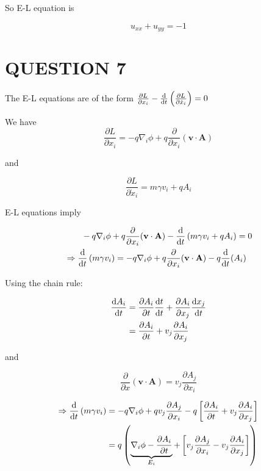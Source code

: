 \documentclass[a4paper]{article}
\begin{document}
\begin{enumerate}
	So E-L equation is 
	
	\[ u_{xx} + u_{yy} = -1  \]
	
	
	
	
	
\end{enumerate}


\section{QUESTION 7}

The E-L equations are of the form $ \frac{\partial L }{\partial x_{i} } - \frac{\mathrm{d} }{\mathrm{d} t} \left(  \frac{\partial L}{\partial \dot{x}_{i}} \right) = 0 $

We have
\[ \frac{\partial L }{\partial x_{i}} = - q \nabla_{i} \phi + q \frac{\partial }{\partial x_{i}} (\mathbf{v} \cdot \mathbf{A}) \]

and

\[ \frac{\partial L }{\partial \dot{x}_{i}} = m \gamma v_{i} + q A_{i} \]


E-L equations imply

\begin{align*}
& \quad \quad - q \nabla_{i} \phi + q \frac{\partial }{\partial x_{i}} (\mathbf{v} \cdot \mathbf{A}) - \frac{\mathrm{d} }{\mathrm{d} t}  \left(  m \gamma v_{i} + q A_{i} \right) = 0   \\
& \Rightarrow  \frac{\mathrm{d} }{\mathrm{d} t}  \left(  m \gamma v_{i} \right) = - q \nabla_{i} \phi + q \frac{\partial }{\partial x_{i}} (\mathbf{v} \cdot \mathbf{A}) - q \frac{\mathrm{d} }{\mathrm{d} t}( A_{i})
 \end{align*}
 
 
Using the chain rule:
 
\begin{align*}
\frac{\mathrm{d} A_{i}}{\mathrm{d} t} & = \frac{\partial A_{i} }{\partial t} \frac{\mathrm{d} t}{\mathrm{d} t } + \frac{\partial A_{i} }{\partial x_{j}} \frac{\mathrm{d} x_{j}}{\mathrm{d} t} \\
& = \frac{\partial A_{i} }{\partial t} +  v_{j} \frac{\partial A_{i} }{\partial x_{j}} 
\end{align*}

and

\[ \frac{\partial }{\partial x} (\mathbf{v} \cdot \mathbf{A}) = v_{j} \frac{\partial A_{j} }{\partial x_{i}}  \]


\begin{align*}
\Rightarrow  \frac{\mathrm{d} }{\mathrm{d} t}  \left(  m \gamma v_{i} \right) & = - q \nabla_{i} \phi + q v_{j} \frac{\partial A_{j} }{\partial x_{i}} - q \left[  \frac{\partial A_{i} }{\partial t} +  v_{j} \frac{\partial A_{i} }{\partial x_{j}} \right] \\
 & = q \left( \underbrace{\nabla_{i} \phi - \frac{\partial A_{i} }{\partial t}}_{E_{i}}  + \left[ v_{j} \frac{\partial A_{j} }{\partial x_{i}}  -  v_{j} \frac{\partial A_{i} }{\partial x_{j}} \right]    \right)  
\end{align*}
\end{document}
